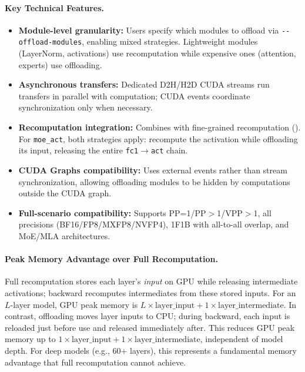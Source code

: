 \paragraph{Key Technical Features.}
\begin{itemize}[itemsep=2pt,topsep=4pt]
    \item \textbf{Module-level granularity:} Users specify which modules to offload via \verb|--offload-modules|, enabling mixed strategies. Lightweight modules (LayerNorm, activations) use recomputation while expensive ones (attention, experts) use offloading.
    \item \textbf{Asynchronous transfers:} Dedicated D2H/H2D CUDA streams run transfers in parallel with computation; CUDA events coordinate synchronization only when necessary.
    \item \textbf{Recomputation integration:} Combines with fine-grained recomputation (). For \texttt{moe\_act}, both strategies apply: recompute the activation while offloading its input, releasing the entire \texttt{fc1}$\rightarrow$\texttt{act} chain.
    \item \textbf{CUDA Graphs compatibility:} Uses external events rather than stream synchronization, allowing offloading modules to be hidden by computations outside the CUDA graph.
    \item \textbf{Full-scenario compatibility:} Supports PP=1/PP$>$1/VPP$>$1, all precisions (BF16/FP8/MXFP8/NVFP4), 1F1B with all-to-all overlap, and MoE/MLA architectures.
\end{itemize}

\paragraph{Peak Memory Advantage over Full Recomputation.}
Full recomputation stores each layer's \textit{input} on GPU while releasing intermediate activations; backward recomputes intermediates from these stored inputs. For an $L$-layer model, GPU peak memory is $L \times \text{layer\_input} + 1 \times \text{layer\_intermediate}$. In contrast, offloading moves layer inputs to CPU; during backward, each input is reloaded just before use and released immediately after. This reduces GPU peak memory up to $1 \times \text{layer\_input} + 1 \times \text{layer\_intermediate}$, independent of model depth. For deep models (e.g., 60+ layers), this represents a fundamental memory advantage that full recomputation cannot achieve.

